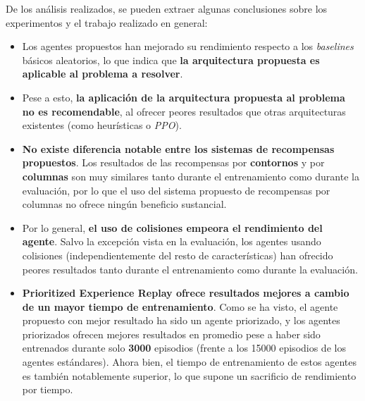 De los análisis realizados, se pueden extraer algunas conclusiones sobre los experimentos y el trabajo realizado en general:
\begin{itemize}
	\item Los agentes propuestos han mejorado su rendimiento respecto a los \textit{baselines} básicos aleatorios, lo que indica que \textbf{la arquitectura propuesta es aplicable al problema a resolver}.
	\item Pese a esto, \textbf{la aplicación de la arquitectura propuesta al problema no es recomendable}, al ofrecer peores resultados que otras arquitecturas existentes (como heurísticas o \textit{PPO}).
	\item \textbf{No existe diferencia notable entre los sistemas de recompensas propuestos}. Los resultados de las recompensas por \textbf{contornos} y por \textbf{columnas} son muy similares tanto durante el entrenamiento como durante la evaluación, por lo que el uso del sistema propuesto de recompensas por columnas no ofrece ningún beneficio sustancial.
	\item Por lo general, \textbf{el uso de colisiones empeora el rendimiento del agente}. Salvo la excepción vista en la evaluación, los agentes usando colisiones (independientemente del resto de características) han ofrecido peores resultados tanto durante el entrenamiento como durante la evaluación.
	\item \textbf{Prioritized Experience Replay ofrece resultados mejores a cambio de un mayor tiempo de entrenamiento}. Como se ha visto, el agente propuesto con mejor resultado ha sido un agente priorizado, y los agentes priorizados ofrecen mejores resultados en promedio pese a haber sido entrenados durante solo \textbf{3000} episodios (frente a los 15000 episodios de los agentes estándares). Ahora bien, el tiempo de entrenamiento de estos agentes es también notablemente superior, lo que supone un sacrificio de rendimiento por tiempo.
\end{itemize}